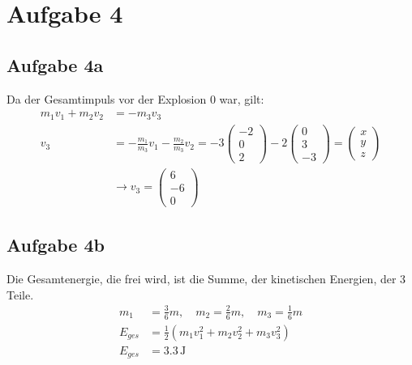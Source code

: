 \documentclass[a4paper,10pt]{extarticle}
\begin{document}
\section*{Aufgabe 4}
  \subsection*{Aufgabe 4a}
  Da der Gesamtimpuls vor der Explosion $0$ war, gilt:
  \begin{align*}
  m_1 v_1 + m_2 v_2 &= - m_3 v_3 \\
  v_3 &= - \frac{m_1}{m_3} v_1 - \frac{m_2}{m_3} v_2 = -3 \begin{pmatrix} -2 \\ 0 \\ 2 \end{pmatrix} -2 \begin{pmatrix} 0 \\ 3 \\ -3 \end{pmatrix} = \begin{pmatrix} x \\ y \\ z \end{pmatrix} \\
  &\rightarrow v_3 = \begin{pmatrix} 6 \\ -6 \\ 0 \end{pmatrix}
  \end{align*}

  \subsection*{Aufgabe 4b}
  Die Gesamtenergie, die frei wird, ist die Summe, der kinetischen Energien, der 3 Teile.
  \begin{align*}
  m_1 &= \frac{3}{6}m, \quad
  m_2 = \frac{2}{6}m, \quad
  m_3 = \frac{1}{6}m \\
  E_{ges} &= \frac{1}{2}(m_1 v_1^2 + m_2 v_2^2 + m_3 v_3^2) \\
  E_{ges} &= 3.3 \, \mbox{J} 
  \end{align*}
  
\end{document}
